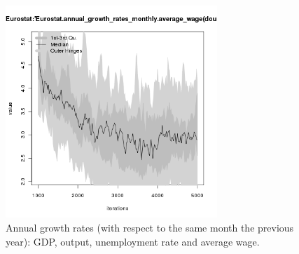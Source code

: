 \begin{figure}[H!]
\begin{minipage}{17cm}
\includegraphics[width=8cm]{./png/tax_0.10/Eurostat-annual_growth_rates_monthly_average_wage.png}
\end{minipage}
\caption{Annual growth rates (with respect to the same month the previous year): GDP, output, unemployment rate and average wage.}
\label{Figure: Eurostat macrodata growth rates}
\end{figure}
\clearpage

